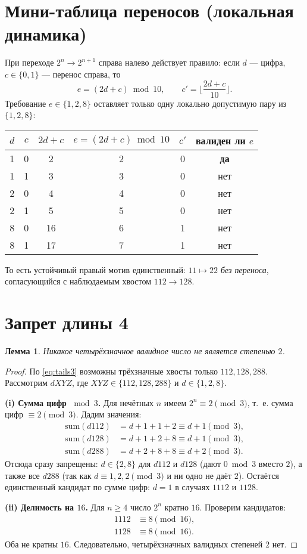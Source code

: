 \documentclass[12pt]{article}
\theoremstyle{plain}
\newtheorem{lemma}{Лемма}
\theoremstyle{remark}
\begin{document}
\section{Мини-таблица переносов (локальная динамика)}
При переходе $2^n\to2^{n+1}$ справа налево действует правило: если $d$ — цифра, $c\in\{0,1\}$ — перенос справа, то
\[
e=(2d+c)\bmod10,\qquad c'=\Big\lfloor\frac{2d+c}{10}\Big\rfloor.
\]
Требование $e\in\{1,2,8\}$ оставляет только одну локально допустимую пару из $\{1,2,8\}$:
\begin{center}
\renewcommand{\arraystretch}{1.1}
\begin{tabular}{@{}cccccc@{}}
\toprule
$d$ & $c$ & $2d+c$ & $e=(2d+c)\bmod10$ & $c'$ & валиден ли $e$ \\
\midrule
1 & 0 & 2  & 2 & 0 & \textbf{да} \\
1 & 1 & 3  & 3 & 0 & нет \\
2 & 0 & 4  & 4 & 0 & нет \\
2 & 1 & 5  & 5 & 0 & нет \\
8 & 0 & 16 & 6 & 1 & нет \\
8 & 1 & 17 & 7 & 1 & нет \\
\bottomrule
\end{tabular}
\end{center}
То есть устойчивый правый мотив единственный: \emph{$11\mapsto22$ без переноса}, согласующийся с наблюдаемым хвостом $112\to128$.

\section{Запрет длины 4}
\begin{lemma}\label{lem:len4}
Никакое четырёхзначное валидное число не является степенью $2$.
\end{lemma}

\begin{proof}
По \eqref{eq:tails3} возможны трёхзначные хвосты только $112,128,288$. Рассмотрим $dXYZ$, где $XYZ\in\{112,128,288\}$ и $d\in\{1,2,8\}$.

\smallskip
\noindent\textbf{(i) Сумма цифр $\bmod 3$.} Для нечётных $n$ имеем $2^n\equiv2\pmod3$, т.~е. сумма цифр $\equiv2\pmod3$. Дадим значения:
\begin{align*}
\mathrm{sum}(d112)&=d+1+1+2\equiv d+1\pmod3,\\
\mathrm{sum}(d128)&=d+1+2+8\equiv d+1\pmod3,\\
\mathrm{sum}(d288)&=d+2+8+8\equiv d+2\pmod3.
\end{align*}
Отсюда сразу запрещены: $d\in\{2,8\}$ для $d112$ и $d128$ (дают $0\bmod3$ вместо $2$), а также все $d288$ (так как $d\equiv1,2,2\pmod3$ и ни одно не даёт $2$). Остаётся единственный кандидат по сумме цифр: $d=1$ в случаях $1112$ и $1128$.

\smallskip
\noindent\textbf{(ii) Делимость на $16$.} Для $n\ge4$ число $2^n$ кратно $16$. Проверим кандидатов:
\begin{align*}
1112 &\equiv 8 \pmod{16},\\
1128 &\equiv 8 \pmod{16}.
\end{align*}
Оба не кратны $16$. Следовательно, четырёхзначных валидных степеней $2$ нет.
\end{proof}
\end{document}
